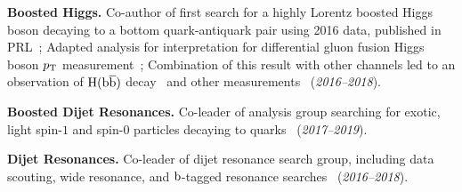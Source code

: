 \documentclass[11pt]{res}
\begin{document}
\begin{resume}
\textbf{Boosted Higgs.} Co-author of first search for a highly Lorentz boosted Higgs boson
  decaying to a bottom quark-antiquark pair using 2016 data, published in
  PRL~\cite{Sirunyan:2017dgc}; Adapted analysis for interpretation for differential gluon fusion Higgs boson $p_{\mathrm{T}}$ measurement~\cite{Sirunyan:2018sgc}; Combination of this result with other channels led to an observation of $\mathrm{H}(\mathrm{b}\overline{\mathrm{b}})$ decay~\cite{Sirunyan:2018kst} and other measurements~\cite{Sirunyan:2018koj} (\textit{2016--2018}).

\textbf{Boosted Dijet Resonances.} Co-leader of analysis group searching for exotic, light spin-$1$ and
  spin-$0$ particles decaying to
  quarks~\cite{Sirunyan:2019vxa,Sirunyan:2019sgo,Sirunyan:2018ikr,Sirunyan:2017nvi} (\textit{2017--2019}).

\textbf{Dijet Resonances.} Co-leader of dijet resonance search group, including data scouting, wide resonance, and $\mathrm{b}$-tagged resonance searches~\cite{Sirunyan:2019pnb,Sirunyan:2019vgj,CMS-PAS-EXO-17-026,Duarte:2018bsd,Sirunyan:2018xlo,Sirunyan:2016iap} (\textit{2016--2018}).


\end{resume}
\end{document}
